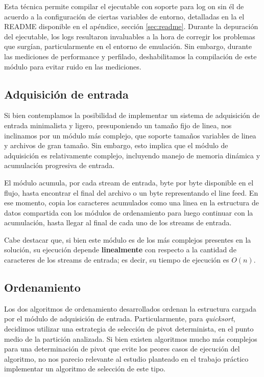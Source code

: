\documentclass[a4paper,11pt]{article}
\begin{document}
Esta técnica permite compilar el ejecutable con soporte para log on sin él de
acuerdo a la configuración de ciertas variables de entorno, detalladas en la el
README disponible en el apéndice, sección \ref{sec:readme}. Durante la
depuración del ejecutable, los logs resultaron invaluables a la hora de
corregir los problemas que surgían, particularmente en el entorno de emulación.
Sin embargo, durante las mediciones de performance y perfilado, deshabilitamos
la compilación de este módulo para evitar ruido en las mediciones.

\subsection{Adquisición de entrada}

Si bien contemplamos la posibilidad de implementar un sistema de adquisición de
entrada minimalista y ligero, presuponiendo un tamaño fijo de linea, nos
inclinamos por un módulo más complejo, que soporte tamaños variables de linea y
archivos de gran tamaño. Sin embargo, esto implica que el módulo de adquisición
es relativamente complejo, incluyendo manejo de memoria dinámica y acumulación
progresiva de entrada.

El módulo acumula, por cada stream de entrada, byte por byte disponible en el
flujo, hasta encontrar el final del archivo o un byte representando el line
feed. En ese momento, copia los caracteres acumulados como una linea en la
estructura de datos compartida con los módulos de ordenamiento para luego
continuar con la acumulación, hasta llegar al final de cada uno de los streams
de entrada.

Cabe destacar que, si bien este módulo es de los más complejos presentes en la
solución, su ejecución depende \textbf{linealmente} con respecto a la cantidad
de caracteres de los streams de entrada; es decir, su tiempo de ejecución es
\(O(n)\).

\subsection{Ordenamiento}

Los dos algoritmos de ordenamiento desarrollados ordenan la estructura cargada
por el módulo de adquisición de entrada. Particularmente, para
\textit{quicksort}, decidimos utilizar una estrategia de selección de pivot
determinista, en el punto medio de la partición analizada. Si bien existen
algoritmos mucho más complejos para una determinación de pivot que evite los
peores casos de ejecución del algoritmo, no nos parecio relevante al estudio
planteado en el trabajo práctico implementar un algoritmo de selección de este
tipo.
\end{document}
